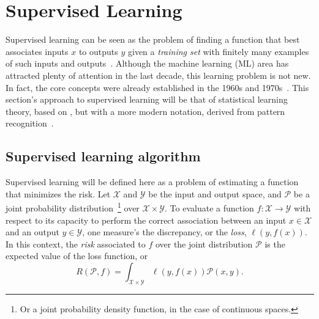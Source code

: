 \section{Supervised Learning}\label{sec:supervised-learning}

Supervised learning can be seen as the problem of finding a function that best associates inputs $x$ to outputs $y$ given a \emph{training set} with finitely many examples of such inputs and outputs~\cite{Goodfellow-et-al-2016}.
Although the machine learning (ML) area has attracted plenty of attention in the last decade, this learning problem is not new.
In fact, the core concepts were already established in the 1960s and 1970s~\cite{vapnikNatureStatisticalLearning2000}.
This section's approach to supervised learning will be that of statistical learning theory, based on , but with a more modern notation, derived from pattern recognition~\cite{bishopPatternRecognitionMachine2006,hastieElementsStatisticalLearning2009}.

\subsection{Supervised learning algorithm}

Supervised learning will be defined here as a problem of estimating a function that minimizes the risk.
Let $\mathcal{X}$ and $\mathcal{Y}$ be the input and output space, and $\mathcal{P}$ be a joint probability distribution~\footnote{Or a joint probability density function, in the case of continuous spaces.} over $\mathcal{X}\times \mathcal{Y}$.
To evaluate a function $f: \mathcal{X} \longrightarrow \mathcal{Y}$ with respect to its capacity to perform the correct association between an input $x\in \mathcal{X}$ and an output $y\in \mathcal{Y}$, one measure's the discrepancy, or the \emph{loss}, $\ell(y,f(x))$.
In this context, the \emph{risk} associated to $f$ over the joint distribution $\mathcal{P}$ is the expected value of the loss function, or \[
    R(\mathcal{P},f) = \int_{\mathcal{X}\times \mathcal{Y}} \ell(y,f(x))\mathcal{P}(x,y)
.\] 



